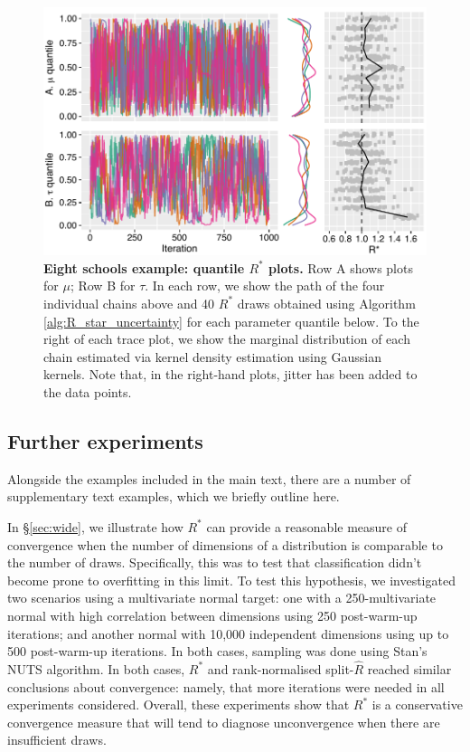 \documentclass[ba]{imsart}
\numberwithin{equation}{section}
\theoremstyle{plain}
\begin{document}
\begin{figure}[!htb]
	\centerline{\includegraphics[width=1.0\textwidth]{eight_schools_r_star_quantiles.pdf}}
	\caption{\textbf{Eight schools example: quantile $R^*$ plots.} Row A shows plots for $\mu$; Row B for $\tau$. In each row, we show the path of the four individual chains above and 40 $R^*$ draws obtained using Algorithm \ref{alg:R_star_uncertainty} for each parameter quantile below. To the right of each trace plot, we show the marginal distribution of each chain estimated via kernel density estimation using Gaussian kernels. Note that, in the right-hand plots, jitter has been added to the data points.}
	\label{fig:eight_schools_r_star_quantiles}
\end{figure}


\subsection{Further experiments}\label{sec:further_experiments}
Alongside the examples included in the main text, there are a number of supplementary text examples, which we briefly outline here.

In \S\ref{sec:wide}, we illustrate how $R^*$ can provide a reasonable measure of convergence when the number of dimensions of a distribution is comparable to the number of draws. Specifically, this was to test that classification didn't become prone to overfitting in this limit. To test this hypothesis, we investigated two scenarios using a multivariate normal target: one with a 250-multivariate normal with high correlation between dimensions using 250 post-warm-up iterations; and another normal with 10,000 independent dimensions using up to 500 post-warm-up iterations. In both cases, sampling was done using Stan's NUTS algorithm. In both cases, $R^*$ and rank-normalised split-$\widehat{R}$ reached similar conclusions about convergence: namely, that more iterations were needed in all experiments considered. Overall, these experiments show that $R^*$ is a conservative convergence measure that will tend to diagnose unconvergence when there are insufficient draws.
\end{document}
